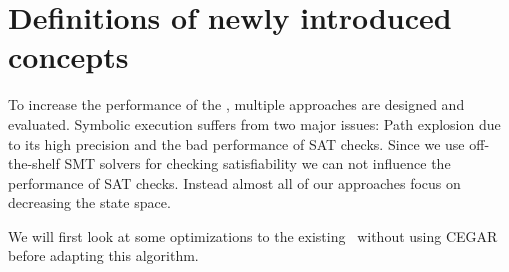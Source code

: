 \chapter{Definitions of newly introduced concepts}

To increase the performance of the \symbolicExecutionCPA, multiple approaches are designed and evaluated.
Symbolic execution suffers from two major issues:
Path explosion due to its high precision and the bad performance of SAT checks.
Since we use off-the-shelf SMT solvers for checking satisfiability we can not influence the performance of SAT checks.
Instead almost all of our approaches focus on decreasing the state space.

We will first look at some optimizations to the existing \symbolicExecutionCPA\ without using CEGAR before adapting this algorithm.





